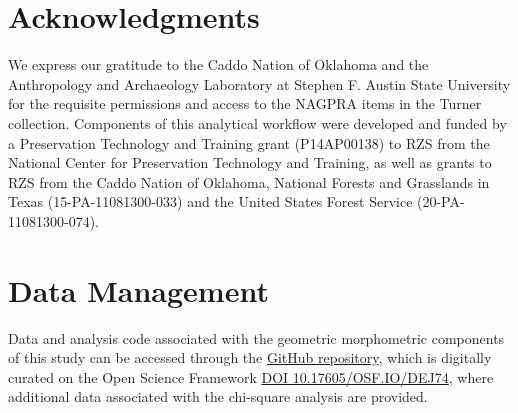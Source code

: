 \documentclass[review]{elsarticle}
\begin{document}
\section*{Acknowledgments}

We express our gratitude to the Caddo Nation of Oklahoma and the Anthropology and Archaeology Laboratory at Stephen F. Austin State University for the requisite permissions and access to the NAGPRA items in the Turner collection. Components of this analytical workflow were developed and funded by a Preservation Technology and Training grant (P14AP00138) to RZS from the National Center for Preservation Technology and Training, as well as grants to RZS from the Caddo Nation of Oklahoma, National Forests and Grasslands in Texas (15-PA-11081300-033) and the United States Forest Service (20-PA-11081300-074).

\section*{Data Management}

Data and analysis code associated with the geometric morphometric components of this study can be accessed through the \href{https://github.com/aksel-blaise/perdiz}{GitHub repository}, which is digitally curated on the Open Science Framework \href{https://osf.io/dej74/}{DOI 10.17605/OSF.IO/DEJ74}, where additional data associated with the chi-square analysis are provided.


\end{document}
